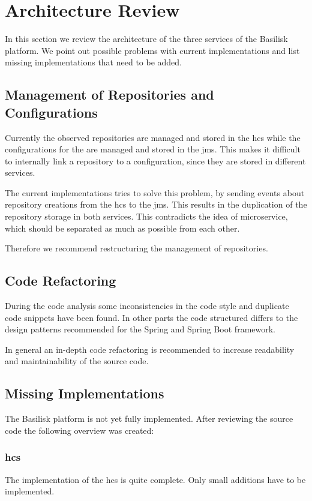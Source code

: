 \section{Architecture Review}
\label{sec:architecture_review}
In this section we review the architecture of the three services of the Basilisk platform.
We point out possible problems with current implementations and list missing implementations that need to be added.


\subsection{Management of Repositories and Configurations}
\label{sec:management_repo_config}
Currently the observed repositories are managed and stored in the \ac{hcs} while the configurations for the \tsp{} are managed and stored in the \ac{jms}.
This makes it difficult to internally link a repository to a \ts{} configuration, since they are stored in different services.

The current implementations tries to solve this problem, by sending events about repository creations from the \ac{hcs} to the \ac{jms}.
This results in the duplication of the repository storage in both services.
This contradicts the idea of microservice, which should be separated as much as possible from each other.

Therefore we recommend restructuring the management of repositories.


\subsection{Code Refactoring}
\label{sec:code_refactor}
During the code analysis some inconsistencies in the code style and duplicate code snippets have been found.
In other parts the code structured differs to the design patterns recommended for the Spring and Spring Boot framework.

In general an in-depth code refactoring is recommended to increase readability and maintainability of the source code. 


\subsection{Missing Implementations}
\label{sec:review_missing_impl}
The Basilisk platform is not yet fully implemented.
After reviewing the source code the following overview was created:

\subsubsection{\acl{hcs}}
The implementation of the \acl{hcs} is quite complete.
Only small additions have to be implemented.

